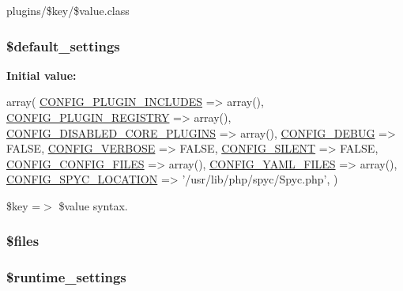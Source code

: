 plugins/\$key/\$value.\-class \hypertarget{common_8inc_a71d9864ceaa1b925fde0c8ea0f77abc3}{
\subsubsection[{\$default\-\_\-settings}]{\setlength{\rightskip}{0pt plus 5cm}\$default\-\_\-settings}}\label{common_8inc_a71d9864ceaa1b925fde0c8ea0f77abc3}
{\bfseries Initial value\-:}
\begin{DoxyCode}
 array(
  \hyperlink{group__config_ga6a85183e9c9f8aaa564fe3ab89f5c155}{CONFIG\_PLUGIN\_INCLUDES} => array(),
  \hyperlink{group__config_gac9a4a3df52ecff6e3489e2834c8d6464}{CONFIG\_PLUGIN\_REGISTRY} => array(),
  \hyperlink{group__config_gabc38296098bf02b2418bd83602e56edc}{CONFIG\_DISABLED\_CORE\_PLUGINS} => array(),
  \hyperlink{group__config_ga45d0602aad6bc9cbe04270b059d48bcd}{CONFIG\_DEBUG} => FALSE,
  \hyperlink{group__config_gad09ed47ac67500b2ba6cc4a88d667a67}{CONFIG\_VERBOSE} => FALSE,
  \hyperlink{group__config_gae51e7d020c4c382825abd620db8f406b}{CONFIG\_SILENT} => FALSE,
  \hyperlink{group__config_gae9bcc12ef43805dccf313d96ba6949ac}{CONFIG\_CONFIG\_FILES} => array(),
  \hyperlink{group__config_gac84613fd7b98146ba56ca2d0ebad83c5}{CONFIG\_YAML\_FILES} => array(),
  \hyperlink{group__config_ga1c9780167f4edef2e4a8688045caeedb}{CONFIG\_SPYC\_LOCATION} => \textcolor{stringliteral}{'/usr/lib/php/spyc/Spyc.php'},
)
\end{DoxyCode}
\$key =$>$ \$value syntax. \hypertarget{common_8inc_a9590b15215a21e9b42eb546aeef79704}{
\subsubsection[{\$files}]{\setlength{\rightskip}{0pt plus 5cm}\$files}}\label{common_8inc_a9590b15215a21e9b42eb546aeef79704}
\hypertarget{common_8inc_ab9492937f7a4246d6d6c94cc9688d7e2}{
\subsubsection[{\$runtime\-\_\-settings}]{\setlength{\rightskip}{0pt plus 5cm}\$runtime\-\_\-settings}}\label{common_8inc_ab9492937f7a4246d6d6c94cc9688d7e2}
